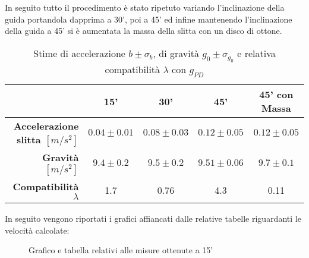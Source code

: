 \documentclass[a4paper,11pt,oneside]{article}
\begin{document}
In seguito tutto il procedimento è stato ripetuto variando l'inclinazione della guida portandola dapprima a 30', poi a 45' ed infine mantenendo l'inclinazione della guida a 45' si è aumentata la massa della slitta con un disco di ottone.\\

\begin{table}[h!]%
    \centering
    \begin{tabular}{r|c|c|c|c}
    \toprule
    & \textbf{15'} & \textbf{30'} & \textbf{45'} & \textbf{45' con Massa}\\
    \midrule
         \textbf{Accelerazione slitta $[\si{m/s^2}]$} & $0.04\pm0.01$    & $0.08\pm0.03$   & $0.12\pm0.05$    & $0.12\pm0.05$\\
        \textbf{Gravità $[\si{m/s^2}]$}       & $9.4\pm0.2$ & $9.5\pm0.2$ & $9.51\pm0.06$ & $9.7\pm0.1$ \\
        \textbf{Compatibilità $\lambda$} &1.7 &0.76 &4.3 &0.11\\
        \bottomrule
    \end{tabular}
    \caption{Stime di accelerazione $b\pm \sigma_{b}$, di gravità $g_{0} \pm \sigma_{g_{0}}$ e relativa compatibilità $\lambda$ con $g_{PD}$}
    \label{tab:stima_b_g}
\end{table}

\bigskip
In seguito vengono riportati i grafici affiancati dalle relative tabelle riguardanti le velocità calcolate:

\begin{figure}[h!]
    \centering
    \caption{Grafico e tabella relativi alle misure ottenute a 15'}
\end{figure}
\end{document}
